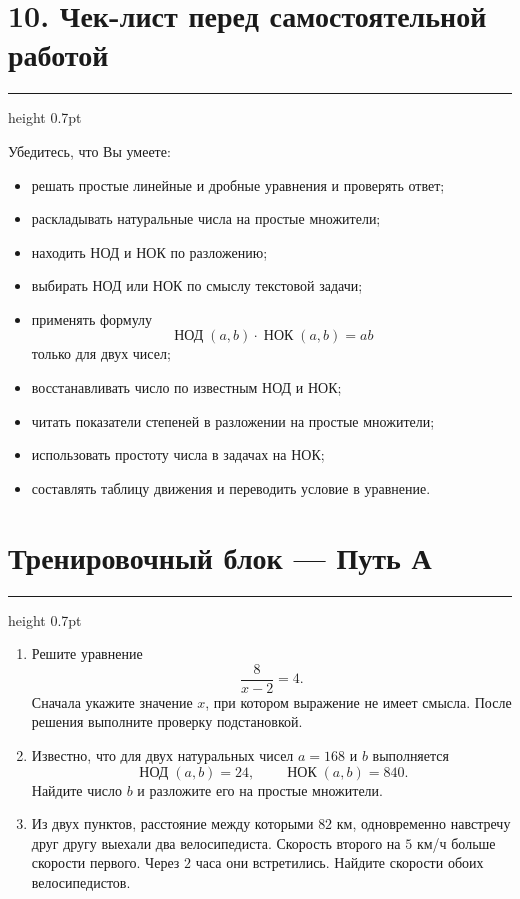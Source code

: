 \documentclass[a4paper,12pt]{article}
\newcommand{\sectionline}{%
  \par\vspace{0.1em}%
  {\color{accent}\hrule height 0.7pt}%
  \vspace{0.55em}}
\newcommand{\GCDru}{\mathop{\text{НОД}}\nolimits}
\newcommand{\LCMru}{\mathop{\text{НОК}}\nolimits}
\begin{document}
\section*{10. Чек-лист перед самостоятельной работой}
\sectionline

Убедитесь, что Вы умеете:

\begin{itemize}

  \item
  решать простые линейные и дробные уравнения
  и проверять ответ;

  \item
  раскладывать натуральные числа
  на простые множители;

  \item
  находить НОД и НОК по разложению;

  \item
  выбирать НОД или НОК
  по смыслу текстовой задачи;

  \item
  применять формулу
  \[
  \GCDru(a,b)\cdot\LCMru(a,b)=ab
  \]
  только для двух чисел;

  \item
  восстанавливать число
  по известным НОД и НОК;

  \item
  читать показатели степеней
  в разложении на простые множители;

  \item
  использовать простоту числа
  в задачах на НОК;

  \item
  составлять таблицу движения
  и переводить условие в уравнение.

\end{itemize}

\clearpage

\section*{Тренировочный блок --- Путь А}
\sectionline

\begin{enumerate}[label=\textbf{\arabic*.}]

  \item
  Решите уравнение
  \[
  \frac{8}{x-2}=4.
  \]
  Сначала укажите значение $x$,
  при котором выражение не имеет смысла.
  После решения выполните проверку подстановкой.

  \item
  Известно, что для двух натуральных чисел
  $a=168$ и $b$ выполняется
  \[
  \GCDru(a,b)=24,
  \qquad
  \LCMru(a,b)=840.
  \]
  Найдите число $b$
  и разложите его на простые множители.

  \item
  Из двух пунктов,
  расстояние между которыми $82$ км,
  одновременно навстречу друг другу
  выехали два велосипедиста.
  Скорость второго на $5$ км/ч
  больше скорости первого.
  Через $2$ часа они встретились.
  Найдите скорости обоих велосипедистов.

\end{enumerate}
\end{document}
